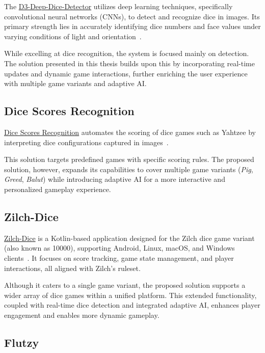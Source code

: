 The \href{https://github.com/harshmunshi/D3-Deep-Dice-Detector}{D3-Deep-Dice-Detector} utilizes deep learning techniques, specifically convolutional neural networks (CNNs), to detect and recognize dice in images. Its primary strength lies in accurately identifying dice numbers and face values under varying conditions of light and orientation~\cite{bib:D3-Dice}.

While excelling at dice recognition, the system is focused mainly on detection. The solution presented in this thesis builds upon this by incorporating real-time updates and dynamic game interactions, further enriching the user experience with multiple game variants and adaptive AI.

\subsection{Dice Scores Recognition}

\href{https://github.com/ordovas/dice-scores-recognition}{Dice Scores Recognition} automates the scoring of dice games such as Yahtzee by interpreting dice configurations captured in images~\cite{bib:Dice-Scores-Recognition}.

This solution targets predefined games with specific scoring rules. The proposed solution, however, expands its capabilities to cover multiple game variants (\emph{Pig}, \emph{Greed}, \emph{Balut}) while introducing adaptive AI for a more interactive and personalized gameplay experience.

\subsection{Zilch-Dice}

\href{https://github.com/pandulapeter/zilch-dice}{Zilch-Dice} is a Kotlin-based application designed for the Zilch dice game variant (also known as 10000), supporting Android, Linux, macOS, and Windows clients~\cite{bib:zilchdice}. It focuses on score tracking, game state management, and player interactions, all aligned with Zilch’s ruleset.

Although it caters to a single game variant, the proposed solution supports a wider array of dice games within a unified platform. This extended functionality, coupled with real-time dice detection and integrated adaptive AI, enhances player engagement and enables more dynamic gameplay.

\subsection{Flutzy}

